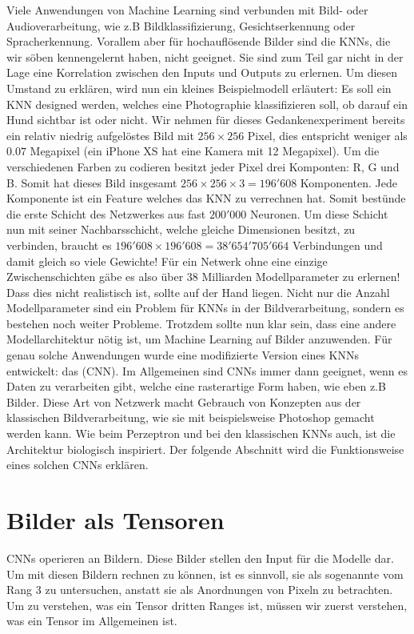 Viele Anwendungen von Machine Learning sind verbunden mit Bild- oder
Audioverarbeitung, wie z.B Bildklassifizierung, Gesichtserkennung oder
Spracherkennung.
Vorallem aber für hochauflösende Bilder sind die KNNs, die wir söben
kennengelernt haben, nicht geeignet. Sie sind zum Teil gar nicht in der
Lage eine Korrelation zwischen den Inputs und Outputs zu erlernen.
Um diesen Umstand zu erklären, wird nun ein kleines Beispielmodell erläutert:
\para{}
\label{sec:CNN_parameter_problem}
Es soll ein KNN designed werden, welches eine Photographie klassifizieren
soll, ob darauf ein Hund sichtbar ist oder nicht. Wir nehmen für dieses
Gedankenexperiment bereits ein relativ niedrig aufgelöstes Bild mit $256 \times 256$
Pixel, dies entspricht weniger als $0.07$ Megapixel (ein iPhone XS hat eine Kamera mit
12 Megapixel). Um die verschiedenen Farben zu codieren besitzt jeder Pixel drei Komponten: R, G
und B. Somit hat dieses Bild insgesamt $256 \times 256 \times 3 = 196'608$
Komponenten. Jede Komponente ist ein Feature welches das KNN zu verrechnen hat. Somit bestünde
die erste Schicht des Netzwerkes aus fast $200'000$ Neuronen. Um diese Schicht
nun mit seiner Nachbarsschicht, welche gleiche Dimensionen besitzt, zu verbinden, braucht
es $196'608 \times 196'608 = 38'654'705'664$ Verbindungen und damit gleich so
viele Gewichte! Für ein Netwerk ohne eine einzige Zwischenschichten gäbe es
also über 38 Milliarden Modellparameter zu erlernen! Dass dies nicht realistisch ist,
sollte auf der Hand liegen.
\para{}
Nicht nur die Anzahl Modellparameter sind ein Problem für KNNs in der
Bildverarbeitung, sondern es bestehen noch weiter Probleme.
Trotzdem sollte nun klar sein, dass eine andere Modellarchitektur nötig ist, um Machine
Learning auf Bilder anzuwenden. Für genau solche Anwendungen wurde eine modifizierte
Version eines KNNs entwickelt: das  (CNN).
Im Allgemeinen sind CNNs immer dann geeignet, wenn es Daten zu verarbeiten gibt, welche eine
rasterartige Form haben, wie eben z.B Bilder.
Diese Art von Netzwerk macht Gebrauch von Konzepten aus der klassischen
Bildverarbeitung, wie sie mit beispielsweise Photoshop gemacht werden kann.
Wie beim Perzeptron und bei den klassischen KNNs auch, ist die Architektur
biologisch inspiriert.
Der folgende Abschnitt wird die Funktionsweise eines solchen CNNs erklären.
\para{}
\cite{Goodfellow-et-al-2016}
\cite{deeplearning.ai:cnn}
\cite{wiki:cnn}


\section{Bilder als Tensoren}\label{sec:tensor}
CNNs operieren an Bildern. Diese Bilder stellen den Input für die Modelle dar.
Um mit diesen Bildern rechnen zu können, ist es sinnvoll, sie als sogenannte
 vom Rang 3 zu untersuchen, anstatt sie als Anordnungen von
Pixeln zu betrachten. \\
Um zu verstehen, was ein Tensor dritten Ranges ist, müssen wir zuerst verstehen, was ein Tensor im Allgemeinen ist.


